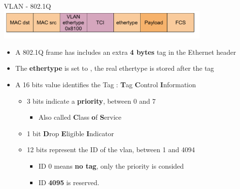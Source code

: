 \begin{frame}{VLAN - 802.1Q}
	\includegraphics[width=0.8\textwidth]{slides/networking-stack-overview/ethernet_frame_vlan.pdf}

	\begin{itemize}
		\item A 802.1Q frame has includes an extra \textbf{4 bytes} tag in the Ethernet header
		\item The \textbf{ethertype} is set to , the real ethertype is stored after the tag
		\item A 16 bits value identifies the Tag : \textbf{T}ag \textbf{C}ontrol \textbf{I}nformation
			\begin{itemize}
				\item 3 bits indicate a \textbf{priority}, between 0 and 7
					\begin{itemize}
						\item Also called \textbf{C}lass \textbf{o}f \textbf{S}ervice
					\end{itemize}
				\item 1 bit \textbf{D}rop \textbf{E}ligible \textbf{I}ndicator
				\item 12 bits represent the ID of the vlan, between 1 and 4094
					\begin{itemize}
						\item ID 0 means \textbf{no tag}, only the priority is consided
						\item ID \textbf{4095} is reserved.
					\end{itemize}
			\end{itemize}
	\end{itemize}
\end{frame}

